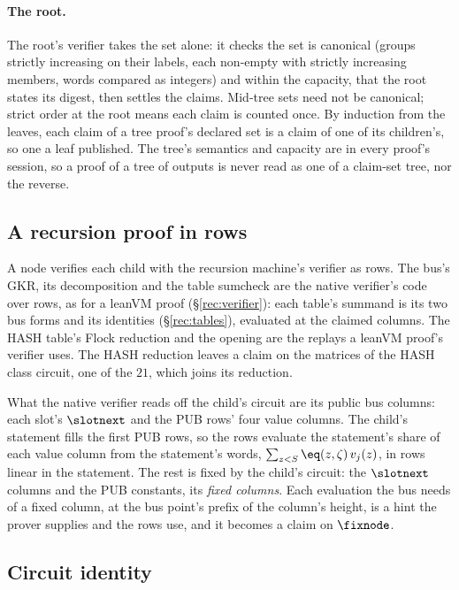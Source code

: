 \paragraph{The root.} The root's verifier takes the set alone: it checks the set is canonical (groups strictly increasing on their labels, each non-empty with strictly increasing members, words compared as integers) and within the capacity, that the root states its digest, then settles the claims. Mid-tree sets need not be canonical; strict order at the root means each claim is counted once. By induction from the leaves, each claim of a tree proof's declared set is a claim of one of its children's, so one a leaf published. The tree's semantics and capacity are in every proof's session, so a proof of a tree of outputs is never read as one of a claim-set tree, nor the reverse.

\subsection{A recursion proof in rows}\label{rec:child}

A node verifies each child with the recursion machine's verifier as rows. The bus's GKR, its decomposition and the table sumcheck are the native verifier's code over rows, as for a leanVM proof (\S\ref{rec:verifier}): each table's summand is its two bus forms and its identities (\S\ref{rec:tables}), evaluated at the claimed columns. The \textsf{HASH} table's Flock reduction and the opening are the replays a leanVM proof's verifier uses. The \textsf{HASH} reduction leaves a claim on the matrices of the \textsf{HASH} class circuit, one of the $21$, which joins its reduction.

What the native verifier reads off the child's circuit are its public bus columns: each slot's $\slotnext$ and the \textsf{PUB} rows' four value columns. The child's statement fills the first \textsf{PUB} rows, so the rows evaluate the statement's share of each value column from the statement's words, $\sum_{z<S}\eq(z,\zeta)\,v_j(z)$, in rows linear in the statement. The rest is fixed by the child's circuit: the $\slotnext$ columns and the \textsf{PUB} constants, its \emph{fixed columns}. Each evaluation the bus needs of a fixed column, at the bus point's prefix of the column's height, is a hint the prover supplies and the rows use, and it becomes a claim on $\fixnode$.

\subsection{Circuit identity}\label{rec:identity}

